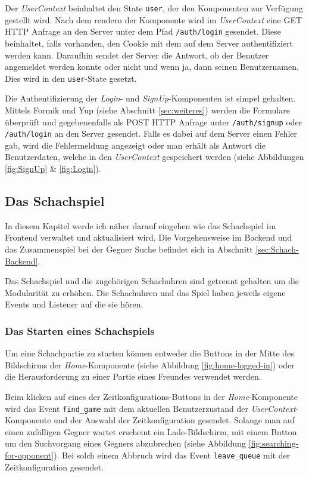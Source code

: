 Der \textit{UserContext} beinhaltet den State \verb|user|, der den Komponenten zur Verfügung gestellt wird.
Nach dem rendern der Komponente wird im \textit{UserContext} eine GET HTTP Anfrage an den Server unter dem Pfad \verb|/auth/login| gesendet. Diese beinhaltet, falls vorhanden, den Cookie mit dem auf dem Server authentifiziert werden kann. Daraufhin sendet der Server die Antwort, ob der Benutzer angemeldet werden konnte oder nicht und wenn ja, dann seinen Benutzernamen.
Dies wird in den \verb|user|-State gesetzt.

Die Authentifizierung der \textit{Login}- und \textit{SignUp}-Komponenten ist simpel gehalten. Mittels Formik und Yup (siehe Abschnitt \ref{sec:weiteres}) werden die Formulare überprüft und gegebenenfalls als POST HTTP Anfrage unter \verb|/auth/signup| oder \verb|/auth/login| an den Server gesendet. Falls es dabei auf dem Server einen Fehler gab, wird die Fehlermeldung angezeigt oder man erhält als Antwort die Benutzerdaten, welche in den \textit{UserContext} gespeichert werden (siehe Abbildungen \ref{fig:SignUp} \& \ref{fig:Login}).
        
        \subsection{Das Schachspiel}
        \label{sec:Schachspiel}
        In diesem Kapitel werde ich näher darauf eingehen wie das Schachspiel im Frontend verwaltet und aktualisiert wird. Die Vorgehensweise im Backend und das Zusammenspiel bei der Gegner Suche befindet sich in Abschnitt \ref{sec:Schach-Backend}.
        
Das Schachspiel und die zugehörigen Schachuhren sind getrennt gehalten um die Modularität zu erhöhen. Die Schachuhren und das Spiel haben jeweils eigene Events und Listener auf die sie hören.
		\subsubsection{Das Starten eines Schachspiels}
		\label{sec:Frontend-Schach-Start}
Um eine Schachpartie zu starten können entweder die Buttons in der Mitte des Bildschirms der \textit{Home}-Komponente (siehe Abbildung \ref{fig:home-logged-in}) oder die Herausforderung zu einer Partie eines Freundes verwendet werden.

Beim klicken auf eines der Zeitkonfigurations-Buttons in der \textit{Home}-Komponente wird das Event \verb|find_game| mit dem aktuellen Benutzerzustand der \textit{UserContext}-Komponente und der Auswahl der Zeitkonfiguration gesendet. Solange man auf einen zufälligen Gegner wartet erscheint ein Lade-Bildschirm, mit einem Button um den Suchvorgang eines Gegners abzubrechen (siehe Abbildung \ref{fig:searching-for-opponent}). Bei solch einem Abbruch wird das Event \verb|leave_queue| mit der Zeitkonfiguration gesendet.

